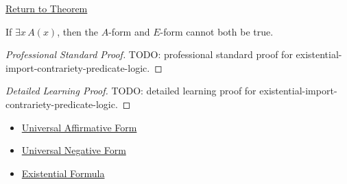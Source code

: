 \newpage
{}
\label{prf:existential-import-contrariety-predicate-logic}

\begin{remark*}[Return]
\hyperref[prop:existential-import-contrariety-predicate-logic]{Return to Theorem}
\end{remark*}

\begin{theorem*}
If \(\exists x\,A(x)\), then the \(A\)-form and \(E\)-form cannot both be true.
\end{theorem*}

\begin{proof}[Professional Standard Proof]
\LRAProofBodyStart
TODO: professional standard proof for existential-import-contrariety-predicate-logic.
\end{proof}

\begin{proof}[Detailed Learning Proof]
\LRAProofBodyStart
TODO: detailed learning proof for existential-import-contrariety-predicate-logic.
\end{proof}

\begin{remark*}
\end{remark*}

\begin{dependencies}
\begin{itemize}
  \item \hyperref[def:categorical-a-form-predicate-logic]{Universal Affirmative Form}
  \item \hyperref[def:categorical-e-form-predicate-logic]{Universal Negative Form}
  \item \hyperref[def:existential-q]{Existential Formula}
\end{itemize}
\end{dependencies}

\clearpage
